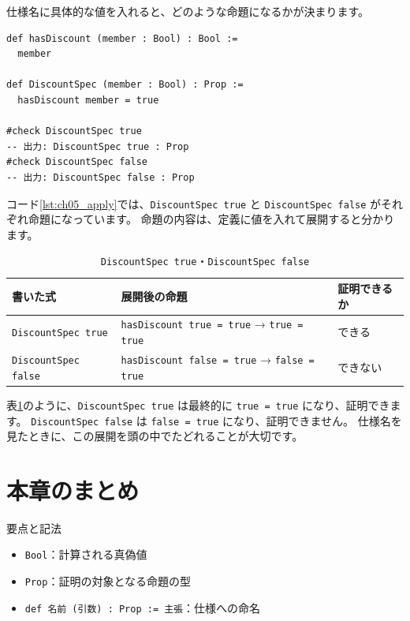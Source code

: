 仕様名に具体的な値を入れると、どのような命題になるかが決まります。

\begin{listing}[htbp]
\begin{verbatim}
def hasDiscount (member : Bool) : Bool :=
  member

def DiscountSpec (member : Bool) : Prop :=
  hasDiscount member = true

#check DiscountSpec true
-- 出力: DiscountSpec true : Prop
#check DiscountSpec false
-- 出力: DiscountSpec false : Prop
\end{verbatim}
\caption{\texttt{DiscountSpec true}・\texttt{DiscountSpec false}}
\label{lst:ch05_apply}
\end{listing}

コード\ref{lst:ch05_apply}では、\texttt{DiscountSpec true} と \texttt{DiscountSpec false} がそれぞれ命題になっています。
命題の内容は、定義に値を入れて展開すると分かります。

\begin{table}[htbp]
\centering
\caption{\texttt{DiscountSpec true}・\texttt{DiscountSpec false}}
\label{tab:ch05-expand}
\begin{tabular}{lll}
\toprule
書いた式 & 展開後の命題 & 証明できるか \\
\midrule
\texttt{DiscountSpec true} & \texttt{hasDiscount true = true} → \texttt{true = true} & できる \\
\texttt{DiscountSpec false} & \texttt{hasDiscount false = true} → \texttt{false = true} & できない \\
\bottomrule
\end{tabular}
\end{table}

表\ref{tab:ch05-expand}のように、\texttt{DiscountSpec true} は最終的に \texttt{true = true} になり、証明できます。
\texttt{DiscountSpec false} は \texttt{false = true} になり、証明できません。
仕様名を見たときに、この展開を頭の中でたどれることが大切です。

\section{本章のまとめ}

要点と記法
\begin{itemize}
\item \texttt{Bool}：計算される真偽値
\item \texttt{Prop}：証明の対象となる命題の型
\item \texttt{def 名前 (引数) : Prop := 主張}：仕様への命名
\end{itemize}
